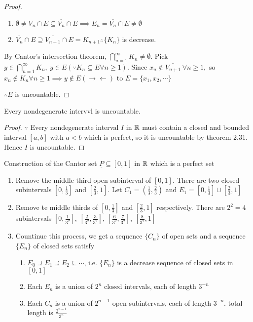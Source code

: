 \begin{proof}
\begin{tcolorbox}
		\begin{enumerate}[label = $\cdot$]
			\item $\emptyset \neq V_n \cap E \subseteq \overline{V_n} \cap E \implies E_n = \overline{V_n} \cap E \neq \emptyset$
			\item $\overline{V_n} \cap E \supseteq \overline{V_{n+1}} \cap E = K_{n+1} \therefore \{K_n\}$ is decrease.
		\end{enumerate}
	\end{tcolorbox}
	
	By Cantor's intersection theorem, $\bigcap^{\infty}_{n=1}K_n \neq \emptyset$. Pick $y \in \bigcap^{\infty}_{n=1}K_n,~ y \in E(\because K_n \subseteq E \forall n \geq 1)$. Since $x_n \notin \overline{V_{n+1}}~\forall n \geq 1,$ so $x_n \notin K_n \forall n \geq 1 \implies y \notin E (\rightarrow\leftarrow)$ to $E = \{x_1,x_2,\cdots\}$
	
	$\therefore E$ is uncountable.
\end{proof}

\begin{cor}
	Every nondegenerate intervvl is uncountable.
\end{cor}

\begin{proof}
	$\because$ Every nondegenerate interval $I$ in $\mathbb{R}$ must contain a closed and bounded interval $[a,b]$ with $a < b$ which is perfect, so it is uncountable by theorem 2.31. Hence $I$ is uncountable.
\end{proof}

Construction of the Cantor set $\underline{P} \subseteq [0,1]$ in $\mathbb{R}$ which is a perfect set

\begin{enumerate}[wide,label = $(\alph*)$]
	\item Remove the middle third open subinterval of $[0,1]$. There are two closed subintervals $[0,\frac{1}{3}]$ and $[\frac{2}{3},1]$. Let $C_1 = (\frac{1}{3},\frac{2}{3})$ and $E_1 = [0,\frac{1}{3}]\cup[\frac{2}{3},1]$
	\item Remove te middle thirds of $[0,\frac{1}{3}]$ and $[\frac{2}{3},1]$ respectively. There are $2^2 = 4$ subintervals $[0,\frac{1}{3^2}],~[\frac{2}{3^2},\frac{3}{3^2}],~[\frac{6}{3^2},\frac{7}{3^2}],~[\frac{8}{3^2},1]$
	\item Countinue this process, we get a sequence $\{C_n\}$ of open sets and a sequence $\{E_n\}$ of closed sets satisfy
	
	\begin{enumerate}[label = $(\roman*)$]
		\item $E_0 \supseteq E_1 \supseteq E_2 \subseteq \cdots$, i.e. $\{E_n\}$ is a decrease sequence of closed sets in $[0,1]$
		\item Each $E_n$ is a union of $2^n$ closed intervals, each of length $3^{-n}$
		\item Each $C_n$ is a union of $2^{n-1}$ open subintervals, each of length $3^{-n}$. total length is $\frac{2^{n-1}}{3^n}$
	\end{enumerate}
\end{enumerate}

